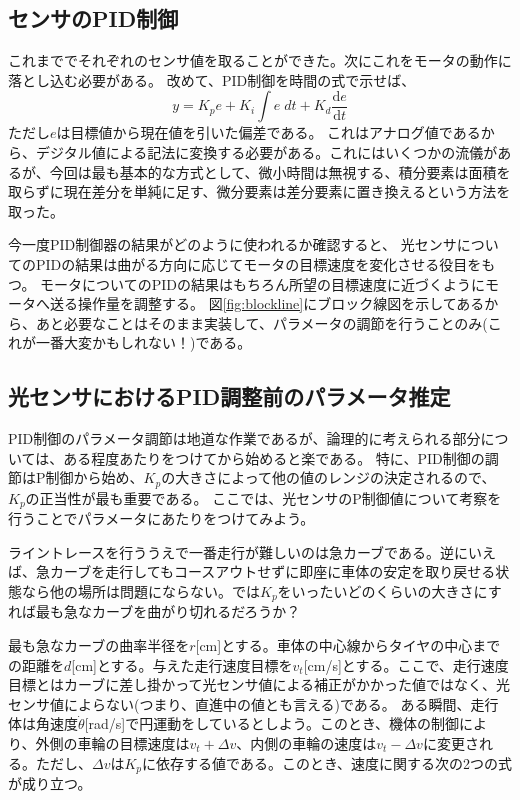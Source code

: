 \documentclass{ltjsreport}
\begin{document}
\subsection{センサのPID制御}\label{sec:SensorIntegration}
これまででそれぞれのセンサ値を取ることができた。次にこれをモータの動作に落とし込む必要がある。
改めて、PID制御を時間の式で示せば、
\[
  y = K_p e + K_i \int e \; dt + K_d  \frac{\mathrm{d}e}{\mathrm{d}t}
\]
ただし$e$は目標値から現在値を引いた偏差である。
これはアナログ値であるから、デジタル値による記法に変換する必要がある。これにはいくつかの流儀があるが、今回は最も基本的な方式として、微小時間は無視する、積分要素は面積を取らずに現在差分を単純に足す、微分要素は差分要素に置き換えるという方法を取った。

今一度PID制御器の結果がどのように使われるか確認すると、
光センサについてのPIDの結果は曲がる方向に応じてモータの目標速度を変化させる役目をもつ。
モータについてのPIDの結果はもちろん所望の目標速度に近づくようにモータへ送る操作量を調整する。
図\ref{fig:blockline}にブロック線図を示してあるから、あと必要なことはそのまま実装して、パラメータの調節を行うことのみ(これが一番大変かもしれない！)である。

\subsection{光センサにおけるPID調整前のパラメータ推定}\label{sec:PIDestimate}
PID制御のパラメータ調節は地道な作業であるが、論理的に考えられる部分については、ある程度あたりをつけてから始めると楽である。
特に、PID制御の調節はP制御から始め、$K_p$の大きさによって他の値のレンジの決定されるので、$K_p$の正当性が最も重要である。
ここでは、光センサのP制御値について考察を行うことでパラメータにあたりをつけてみよう。

ライントレースを行ううえで一番走行が難しいのは急カーブである。逆にいえば、急カーブを走行してもコースアウトせずに即座に車体の安定を取り戻せる状態なら他の場所は問題にならない。では$K_p$をいったいどのくらいの大きさにすれば最も急なカーブを曲がり切れるだろうか？

最も急なカーブの曲率半径を$r$[cm]とする。車体の中心線からタイヤの中心までの距離を$d$[cm]とする。与えた走行速度目標を$v_t$[cm/s]とする。ここで、走行速度目標とはカーブに差し掛かって光センサ値による補正がかかった値ではなく、光センサ値によらない(つまり、直進中の値とも言える)である。
ある瞬間、走行体は角速度$\dot{\theta}$[rad/s]で円運動をしているとしよう。このとき、機体の制御により、外側の車輪の目標速度は$v_t + \Delta v$、内側の車輪の速度は$v_t - \Delta v$に変更される。ただし、$\Delta v $は$K_p$に依存する値である。このとき、速度に関する次の2つの式が成り立つ。
\end{document}
